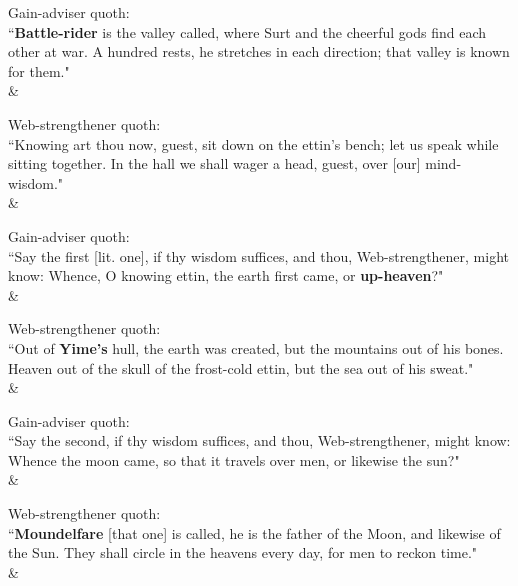 \begin{Rightside}
\begin{astanza}%
\bv Gain-adviser quoth: \\ “\textbf{Battle-rider} is the valley called, where Surt and the cheerful gods find each other at war. A hundred rests\footnotemark[30], he stretches in each direction; that valley is known for them.\footnotemark[31]" \\
\&\end{astanza}%

\begin{astanza}%
\bv Web-strengthener quoth: \\ “Knowing art thou now, guest, sit down on the ettin's bench; let us speak while sitting together. In the hall we shall wager a head, guest, over [our] mind-wisdom." \\
\&\end{astanza}%

\begin{astanza}%
\bv Gain-adviser quoth: \\ “Say the first [lit. one], if thy wisdom suffices, and thou, Web-strengthener, might know: Whence, O knowing ettin, the earth first came, or \textbf{up-heaven}?" \\
\&\end{astanza}%

\begin{astanza}%
\bv Web-strengthener quoth: \\ “Out of \textbf{Yime's} hull\footnotemark[35], the earth was created, but the mountains out of his bones. Heaven out of the skull of the frost-cold ettin, but the sea out of his sweat.\footnotemark[36]" \\
\&\end{astanza}%

\begin{astanza}%
\bv Gain-adviser quoth: \\ “Say the second, if thy wisdom suffices, and thou, Web-strengthener, might know: Whence the moon came, so that it travels over men, or likewise the sun?" \\
\&\end{astanza}%

\begin{astanza}%
\bv Web-strengthener quoth: \\ “\textbf{Moundelfare} [that one] is called, he is the father of the Moon, and likewise of the Sun. They shall circle in the heavens every day, for men to reckon time\footnotemark[40]." \\
\&\end{astanza}%


\end{Rightside}

